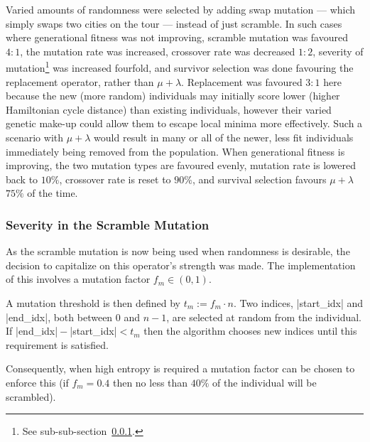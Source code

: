 Varied amounts of randomness were selected by adding swap mutation --- 
which simply swaps two cities on the tour --- instead 
of just scramble. In such cases where generational fitness was not improving, 
scramble mutation was favoured $4:1$, the mutation rate was increased, crossover
rate was decreased $1:2$, severity of mutation\footnote{See
sub-sub-section~\ref{sssec:severity}.}
was increased fourfold, and survivor selection was done favouring the 
replacement operator, rather than $\mu + \lambda$.  
Replacement was favoured $3:1$ here because the new (more random) individuals 
may initially score lower (\ie higher Hamiltonian cycle distance) than existing 
individuals, however their varied genetic make-up could allow them to escape 
local minima more effectively. Such a 
scenario with $\mu + \lambda$ would result in many or all of the newer, less 
fit individuals immediately being removed from the population. When generational
fitness is improving, the two mutation types are favoured evenly, mutation rate is 
lowered back to $10\%$, crossover rate is reset to $90\%$, and survival
selection favours $\mu + \lambda$ $75\%$ of the time.

\subsubsection{Severity in the Scramble Mutation}\label{sssec:severity}
As the scramble mutation is now being used when randomness is desirable, the 
decision to capitalize on this operator's strength was made. The implementation
of this involves a mutation factor $f_m \in (0, 1)$. 

{\small}
\noindent A mutation threshold is then defined by ${t_m := f_m \cdot n}$. 
Two indices, |start_idx| and |end_idx|, both between $0$ and $n-1$, are 
selected at random from the individual. If |end_idx|${}-{}$|start_idx|${}< t_m$
then the algorithm chooses new indices until this requirement is satisfied.

Consequently, when high entropy is required a mutation factor can be chosen 
to enforce this (\eg if $f_m = 0.4$ then no less than $40\%$ of the individual
will be scrambled).
